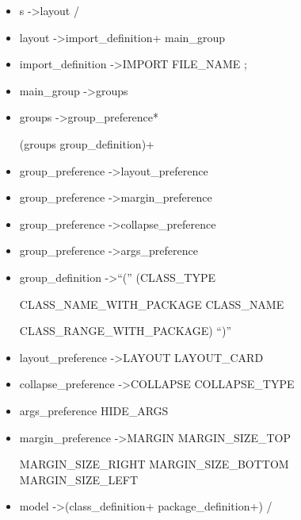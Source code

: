 
\begin{itemize}
  
\item s   -\textgreater   layout  /

 \item layout   -\textgreater   import{\_}definition+	main{\_}group

 \item import{\_}definition   -\textgreater   IMPORT  FILE{\_}NAME  ;

 \item main{\_}group   -\textgreater   groups

 \item groups   -\textgreater   group{\_}preference*  
 
 (groups \textbar group{\_}definition)+

 \item group{\_}preference   -\textgreater   layout{\_}preference

 \item group{\_}preference   -\textgreater   margin{\_}preference

 \item group{\_}preference   -\textgreater   collapse{\_}preference

 \item group{\_}preference   -\textgreater   args{\_}preference

 \item group{\_}definition   -\textgreater   ``(''  (CLASS{\_}TYPE   
 
 \textbar   CLASS{\_}NAME{\_}WITH{\_}PACKAGE   \textbar   CLASS{\_}NAME   
 
 \textbar   CLASS{\_}RANGE{\_}WITH{\_}PACKAGE)  ``)''

 \item layout{\_}preference   -\textgreater   LAYOUT  LAYOUT{\_}CARD

 \item collapse{\_}preference   -\textgreater   COLLAPSE  COLLAPSE{\_}TYPE

 \item args{\_}preference  HIDE{\_}ARGS

 \item margin{\_}preference   -\textgreater   MARGIN  MARGIN{\_}SIZE{\_}TOP  
 
 MARGIN{\_}SIZE{\_}RIGHT  MARGIN{\_}SIZE{\_}BOTTOM  MARGIN{\_}SIZE{\_}LEFT

 \item model   -\textgreater   (class{\_}definition+   \textbar   package{\_}definition+)  /


\end{itemize}
